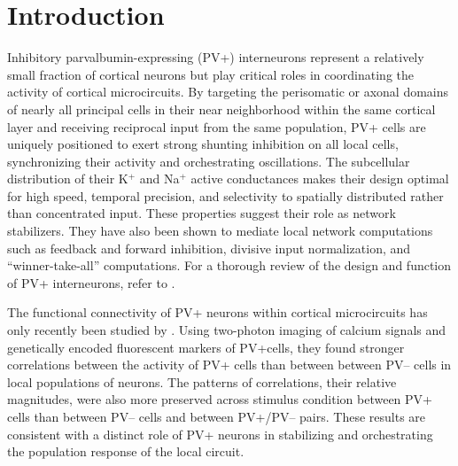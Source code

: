 \section{Introduction}
Inhibitory parvalbumin-expressing (PV+) interneurons represent a relatively small fraction of cortical neurons but play critical roles in coordinating the activity of cortical microcircuits. 
By targeting the perisomatic or axonal domains of nearly all principal cells in their near neighborhood within the same cortical layer and receiving reciprocal input from the same population, PV+ cells are uniquely positioned to exert strong shunting inhibition on all local cells, synchronizing their activity and orchestrating oscillations. 
The subcellular distribution of their K$^+$ and Na$^+$ active conductances makes their design optimal for high speed, temporal precision, and selectivity to spatially distributed rather than concentrated input. 
These properties suggest their role as network stabilizers. 
They have also been shown to mediate local network computations such as feedback and forward inhibition, divisive input normalization, and ``winner-take-all'' computations. 
For a thorough review of the design and function of PV+ interneurons, refer to \cite{Hu:2014}.

The functional connectivity of PV+ neurons within cortical microcircuits has only recently been studied by \cite{Hofer:2011}. Using two-photon imaging of calcium signals and genetically encoded fluorescent markers of PV+cells, they found stronger correlations between the activity of PV+ cells than between between PV-- cells in local populations of neurons. The patterns of correlations, \ie their relative magnitudes, were also more preserved across stimulus condition between PV+ cells than between PV-- cells and between PV+/PV-- pairs. These results are consistent with a distinct role of PV+ neurons in stabilizing and orchestrating the population response of the local circuit.

